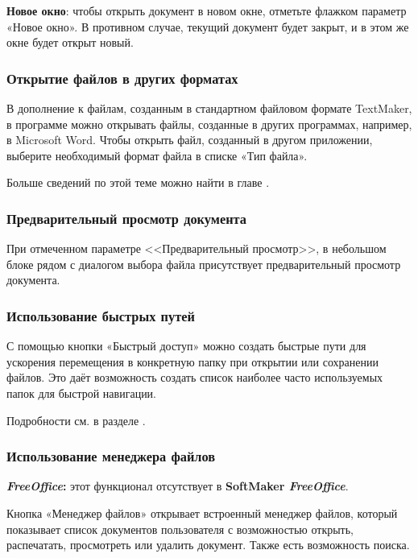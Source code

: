 ﻿\documentclass[a4paper,10pt]{article}
\begin{document}
\textbf{Новое окно}: чтобы открыть документ в новом окне, отметьте флажком параметр «Новое окно». В противном случае, текущий документ будет закрыт, и в этом же окне будет открыт новый.

\subsubsection{Открытие файлов в других форматах}
В дополнение к файлам, созданным в стандартном файловом формате TextMaker, в программе можно открывать файлы, созданные в других программах, например, в Microsoft Word. Чтобы открыть файл, созданный в другом приложении,  выберите необходимый формат файла в списке «Тип файла». 

Больше сведений по этой теме можно найти в главе .

\subsubsection{Предварительный просмотр документа}
При отмеченном параметре <<Предварительный просмотр>>, в небольшом блоке рядом с диалогом выбора файла присутствует предварительный просмотр документа.

\subsubsection{Использование быстрых путей}
С помощью кнопки «Быстрый доступ» можно создать быстрые пути для ускорения перемещения в конкретную папку при открытии или сохранении файлов. Это даёт возможность создать список наиболее часто используемых папок для быстрой навигации.

Подробности см. в разделе .

\subsubsection{Использование менеджера файлов}
\begin{mdframed}[backgroundcolor=pink!50]
\textbf{\textit{FreeOffice}:} этот функционал отсутствует в \textbf{SoftMaker \textit{FreeOffice}}.
\end{mdframed}

Кнопка «Менеджер файлов» открывает встроенный менеджер файлов, который показывает список документов пользователя с возможностью открыть, распечатать, просмотреть или удалить документ. Также есть возможность поиска.
\end{document}
